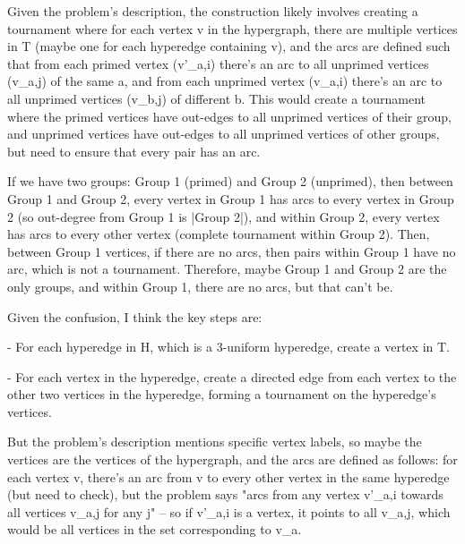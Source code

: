 Given the problem's description, the construction likely involves creating a tournament where for each vertex v in the hypergraph, there are multiple vertices in T (maybe one for each hyperedge containing v), and the arcs are defined such that from each primed vertex (v'_a,i) there's an arc to all unprimed vertices (v_a,j) of the same a, and from each unprimed vertex (v_a,i) there's an arc to all unprimed vertices (v_b,j) of different b. This would create a tournament where the primed vertices have out-edges to all unprimed vertices of their group, and unprimed vertices have out-edges to all unprimed vertices of other groups, but need to ensure that every pair has an arc.

If we have two groups: Group 1 (primed) and Group 2 (unprimed), then between Group 1 and Group 2, every vertex in Group 1 has arcs to every vertex in Group 2 (so out-degree from Group 1 is |Group 2|), and within Group 2, every vertex has arcs to every other vertex (complete tournament within Group 2). Then, between Group 1 vertices, if there are no arcs, then pairs within Group 1 have no arc, which is not a tournament. Therefore, maybe Group 1 and Group 2 are the only groups, and within Group 1, there are no arcs, but that can't be.

Given the confusion, I think the key steps are:

- For each hyperedge in H, which is a 3-uniform hyperedge, create a vertex in T.

- For each vertex in the hyperedge, create a directed edge from each vertex to the other two vertices in the hyperedge, forming a tournament on the hyperedge's vertices.

But the problem's description mentions specific vertex labels, so maybe the vertices are the vertices of the hypergraph, and the arcs are defined as follows: for each vertex v, there's an arc from v to every other vertex in the same hyperedge (but need to check), but the problem says "arcs from any vertex v'_a,i towards all vertices v_a,j for any j" – so if v'_a,i is a vertex, it points to all v_a,j, which would be all vertices in the set corresponding to v_a.

